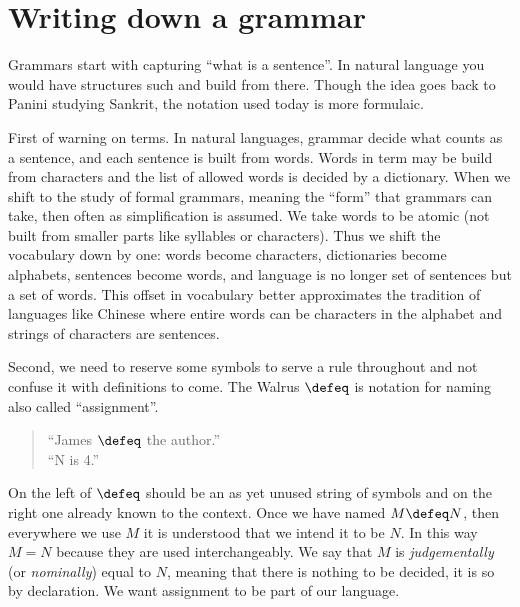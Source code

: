 \section{Writing down a grammar}
Grammars start with capturing ``what is a sentence''.  In natural 
language you would have structures such  and build 
from there.  Though the idea goes back to Panini studying Sankrit,
the notation used today is more formulaic.

First of warning on terms.  In natural languages, grammar decide what 
counts as a sentence, and each sentence is built from words.  Words in term 
may be build from characters and the list of allowed words is decided by a dictionary.
When we shift to the study of formal grammars, meaning the ``form'' that grammars can 
take, then often as simplification is assumed.  We take words to be atomic (not built 
from smaller parts like syllables or characters).  Thus we shift the vocabulary down by 
one: words become characters, dictionaries become alphabets, sentences become words, 
and language is no longer set of sentences but a set of words.
This offset in vocabulary better approximates the tradition of languages like
Chinese where entire words can be characters in the alphabet and strings of
characters are sentences.

Second, we need to reserve some symbols to serve a rule throughout and not confuse 
it with definitions to come.  The Walrus $\defeq$ is notation for naming
also called ``assignment''.
\begin{quote}
    ``James $\defeq$ the author.''\\
    ``N is 4.''
\end{quote}
On the left of $\defeq$ should be an as yet unused string of symbols and on the right 
one already known to the context.  Once we have named $M\defeq N$, then 
everywhere we use $M$ it is understood that we intend it to be $N$.
In this way $M=N$ because they are used interchangeably.  We say that 
$M$ is \emph{judgementally} (or \emph{nominally}) equal to $N$, meaning that there is 
nothing to be decided, it is so by declaration.
We want assignment to be part of our language.

